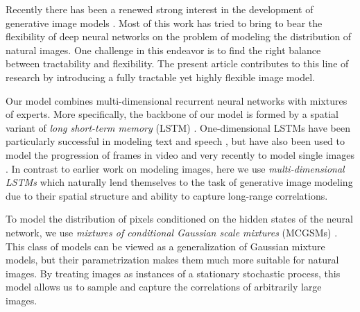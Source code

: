 \documentclass{article}
\begin{document}
Recently there has been a renewed strong interest in the development of generative image models
		\cite[e.g.,][]{VanDenOord:2014b,Kingma:2014a,Uria:2014,Gregor:2014,Goodfellow:2014,Ranzato:2014,Gregor:2015,Sohl-Dickstein:2015,Li:2015,Denton:2015}.
		Most of this work has tried to bring to bear the flexibility of deep neural networks on the
		problem of modeling the distribution of natural images. One challenge in this endeavor is to
		find the right balance between tractability and flexibility. The present article contributes
		to this line of research by introducing a fully tractable yet highly flexible image model.

Our model combines multi-dimensional recurrent neural networks \cite{Graves:2009} with
		mixtures of experts. More specifically, the backbone of our model is formed by a spatial variant of
		\textit{long short-term memory} (LSTM) \cite{Hochreiter:1997}.
		One-dimensional LSTMs have been particularly successful in modeling text and speech
		\cite[e.g.,][]{Sundermeyer:2010,Sutskever:2014}, but have also been used to model the progression of frames in video \cite{Srivastava:2014} and very
		recently to model single images \cite{Gregor:2015}. In contrast to earlier work on modeling
		images, here we use \textit{multi-dimensional LSTMs} \cite{Graves:2009} which naturally lend themselves to the task
		of generative image modeling due to their spatial structure and ability to capture long-range
		correlations.

To model the distribution of pixels conditioned on the hidden states of the neural network, we use
		\textit{mixtures of conditional Gaussian scale mixtures} (MCGSMs) \cite{Theis:2012a}.
		This class of models can be viewed as a generalization of Gaussian mixture models, but
		their parametrization makes them much more suitable for natural images. By treating
		images as instances of a stationary stochastic process, this model allows us to sample and capture the
		correlations of arbitrarily large images.
\end{document}
